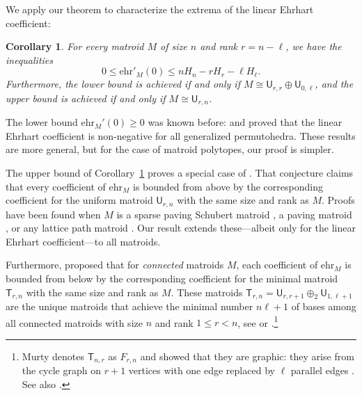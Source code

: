 \documentclass[pagesize,paper=A4,11pt,bibliography=totoc,oneside]{scrartcl}
\newtheorem{corollary}[thm]{Corollary}
\newcommand{\UM}[2]{\mathsf{U}_{#2,#1}} %
\newcommand{\MM}[2]{\mathsf{T}_{#2,#1}} %
\newcommand{\ehr}{\mathrm{ehr}}
\newcommand{\HN}{H} %
\begin{document}
We apply our theorem to characterize the extrema of the linear Ehrhart coefficient:
\begin{corollary}\label{cor:0-uniform}
    For every matroid $M$ of size $n$ and rank $r=n-\ell$, we have the inequalities
    \begin{equation*}
        0 %
        \leq\ehr'_M(0)
        \leq 
        n\HN_n-r\HN_r-\ell \HN_\ell.
    \end{equation*}
    Furthermore, the lower bound is achieved if and only if $M\cong \UM{r}{r}\oplus\UM{\ell}{0}$, and the upper bound is achieved if and only if $M\cong\UM{n}{r}$.
\end{corollary}
The lower bound $\ehr_M'(0)\geq 0$ was known before: \cite[Theorem~4.5]{JochemkoRavichandran:PermuEhrPos} and \cite[Theorem~7.5]{CastilloLiu:ToddPermuto} proved that the linear Ehrhart coefficient is non-negative for all generalized permutohedra. These results are more general, but for the case of matroid polytopes, our proof is simpler.

The upper bound of Corollary~\ref{cor:0-uniform} proves a special case of \cite[Conjecture~1.5]{Ferroni:EhrhartMinimal}. That conjecture claims that every coefficient of $\ehr_M$ is bounded from above by the corresponding coefficient for the uniform matroid $\UM{n}{r}$ with the same size and rank as $M$. Proofs have been found when $M$ is a sparse paving Schubert matroid \cite[Theorem~1.10]{FanLi:EhrhartSchubert}, a paving matroid \cite[Theorem~1.4]{DMV:PanhandlePavingChain}, or any lattice path matroid \cite[Theorem~4.1]{FerroniMoralesPanova:EhrPosLat}. Our result extends these---albeit only for the linear Ehrhart coefficient---to all matroids.

Furthermore, \cite[Conjecture~1.5]{Ferroni:EhrhartMinimal} proposed that for \emph{connected} matroids $M$, each coefficient of $\ehr_M$ is bounded from below by the corresponding coefficient for the minimal matroid $\MM{n}{r}$ with the same size and rank as $M$. These matroids $\MM{n}{r}=\UM{r+1}{r}\oplus_2 \UM{\ell+1}{1}$ are the unique matroids that achieve the minimal number $n\ell+1$ of bases among all connected matroids with size $n$ and rank $1\leq r<n$, see \cite[Theorem~5]{Murty:NumberBases} or \cite[Theorem~3.2]{Dinolt:ExNonSep}.\footnote{Murty denotes $\MM{r}{n}$ as $F_{r,n}$ and showed that they are graphic: they arise from the cycle graph on $r+1$ vertices with one edge replaced by $\ell$ parallel edges \cite[Figure~1]{Murty:NumberBases}. See also \cite[\S2]{Ferroni:EhrhartMinimal}.}
\end{document}

